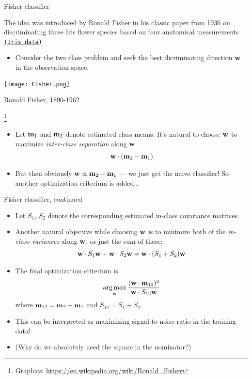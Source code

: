 \documentclass[handout]{beamer}   %
\def\S{S}
\def\argmax{\mathop{\rm arg\,max}\limits}
\def\b#1{{\bf #1}}
\newcommand\blfootnote[1]{%
  \begingroup
  \renewcommand\thefootnote{}\footnote{#1}%
  \addtocounter{footnote}{-1}%
  \endgroup
}
\newcommand\graphics[1]{%
  \blfootnote{\hbox{}\hskip-0.6cm Graphics: \url{#1}}%
}
\begin{document}
\begin{frame}{Fisher classifier}
  \begin{minipage}[c]{6cm}
    The idea was introduced by Ronald Fisher in his classic paper from 1936
    on discriminating three Iris flower species based on four anatomical measurements
    \href{https://en.wikipedia.org/wiki/Iris_flower_data_set}{\tt (Iris data)}

    \pause
    \begin{itemize}
    \item Consider the two class problem and seek the best dicriminating direction $\b w$
      in the observation space.
    \end{itemize}
  \end{minipage}
  \hfil
  \begin{minipage}[c]{4cm}
    \texttt{[image: Fisher.png]}
    \par\noindent
    Ronald Fisher, 1890-1962
  \end{minipage}%
  \graphics{https://en.wikipedia.org/wiki/Ronald_Fisher}%
  \pause
  
  \begin{itemize}
  \item Let $\b m_1$ and $\b m_2$ denote estimated class means.
    It's natural to choose $\b w$ to maximize {\it inter-class separation} along $\b w$
    $$ \b w \cdot (\b m_2 - \b m_1) $$%

    \pause
  \item But then obviously $\b w \propto \b m_2 - \b m_1$ --- we just get the naive classifier!
    So another optimization criterium is added\dots
  \end{itemize}
\end{frame}


\begin{frame}{Fisher classifier, continued}
  \begin{itemize}
  \item Let $\S_1$, $\S_2$ denote the corresponding estimated
    in-class covariance matrices.

    \pause
  \item Another natural objective while choosing $\b w$ is to minimize both of the
    {\it in-class variances\/} along $\b w$, or just the sum of these:
    $$ \b w \cdot \S_1 \b w + \b w \cdot \S_2 \b w
    = \b w \cdot (\S_1 + \S_2) \b w $$

    \pause
  \item The final optimization criterium is
    \begin{equation}  \label{eq:fisher}
      \argmax_{\b w}
      {(\b w\cdot \b m_{12})^2 \over \b w \cdot \S_{12} \b w}
    \end{equation}
    where $\b m_{12} =\b m_2 - \b m_1$ and $\S_{12} = \S_1 + \S_2$.

    \pause
  \item This can be interpreted as maximizing signal-to-noise ratio in the training data!

    \pause
  \item (Why do we absolutely need the square in the nominator?)
  \end{itemize}
\end{frame}
\def\eqfisher{\eqref{eq:fisher}}
\end{document}
